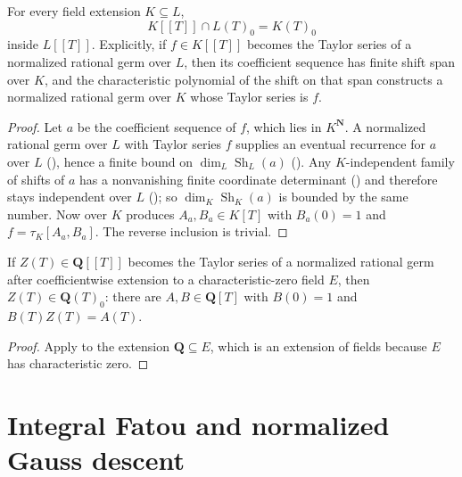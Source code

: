\begin{theorem}
\label{thm:zla-hankel-descent}
\leanok
For every field extension $K\subseteq L$,
\[
  K[[T]]\cap L(T)_0=K(T)_0
\]
inside $L[[T]]$.  Explicitly, if $f\in K[[T]]$ becomes the Taylor series of a
normalized rational germ over $L$, then its coefficient sequence has finite
shift span over $K$, and the characteristic polynomial of the shift on that
span constructs a normalized rational germ over $K$ whose Taylor series is
$f$.
\end{theorem}
\begin{proof}
\leanok
Let $a$ be the coefficient sequence of $f$, which lies in $K^{\mathbf N}$.  A
normalized rational germ over $L$ with Taylor series $f$ supplies an eventual
recurrence for $a$ over $L$ (), hence a finite
bound on $\dim_L\operatorname{Sh}_L(a)$
().  Any $K$-independent family of shifts
of $a$ has a nonvanishing finite coordinate determinant
() and therefore stays independent over $L$
(); so $\dim_K\operatorname{Sh}_K(a)$ is
bounded by the same number.  Now  over $K$
produces $A_a,B_a\in K[T]$ with $B_a(0)=1$ and
$f=\tau_K[A_a,B_a]$.  The reverse inclusion is trivial.
\end{proof}

\begin{corollary}
\label{cor:zla-rationality-counting-field}
\leanok
If $Z(T)\in\mathbf Q[[T]]$ becomes the Taylor series of a normalized rational
germ after coefficientwise extension to a characteristic-zero field $E$, then
$Z(T)\in\mathbf Q(T)_0$: there are $A,B\in\mathbf Q[T]$ with $B(0)=1$ and
$B(T)Z(T)=A(T)$.
\end{corollary}
\begin{proof}
\leanok
Apply  to the extension $\mathbf Q\subseteq E$,
which is an extension of fields because $E$ has characteristic zero.
\end{proof}

\section{Integral Fatou and normalized Gauss descent}\label{sec:zla-fatou}

